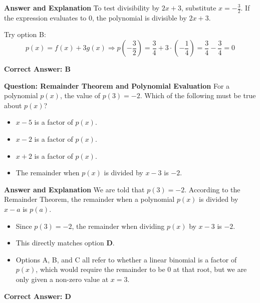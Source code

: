 \documentclass{beamer}
\begin{document}
\begin{frame}{\textbf{Answer and Explanation}}
To test divisibility by \( 2x + 3 \), substitute \( x = -\frac{3}{2} \). If the expression evaluates to 0, the polynomial is divisible by \( 2x + 3 \).



Try option B:
\[
p(x) = f(x) + 3g(x) \Rightarrow p\left(-\frac{3}{2}\right) = \frac{3}{4} + 3 \cdot \left(-\frac{1}{4}\right) = \frac{3}{4} - \frac{3}{4} = 0
\]

\textbf{Correct Answer: B}
\end{frame}

\begin{frame}{\textbf{Question: Remainder Theorem and Polynomial Evaluation}}
For a polynomial \( p(x) \), the value of \( p(3) = -2 \). Which of the following must be true about \( p(x) \)?

\begin{itemize}
    \item[A.] \( x - 5 \) is a factor of \( p(x) \).
    \item[B.] \( x - 2 \) is a factor of \( p(x) \).
    \item[C.] \( x + 2 \) is a factor of \( p(x) \).
    \item[D.] The remainder when \( p(x) \) is divided by \( x - 3 \) is \(-2\).
\end{itemize}
\end{frame}

\begin{frame}{\textbf{Answer and Explanation}}
We are told that \( p(3) = -2 \). According to the Remainder Theorem, the remainder when a polynomial \( p(x) \) is divided by \( x - a \) is \( p(a) \).

\begin{itemize}
    \item Since \( p(3) = -2 \), the remainder when dividing \( p(x) \) by \( x - 3 \) is \(-2\).
    \item This directly matches option \textbf{D}.
    \item Options A, B, and C all refer to whether a linear binomial is a factor of \( p(x) \), which would require the remainder to be 0 at that root, but we are only given a non-zero value at \( x = 3 \).
\end{itemize}

\textbf{Correct Answer: D}
\end{frame}



    
\end{document}
